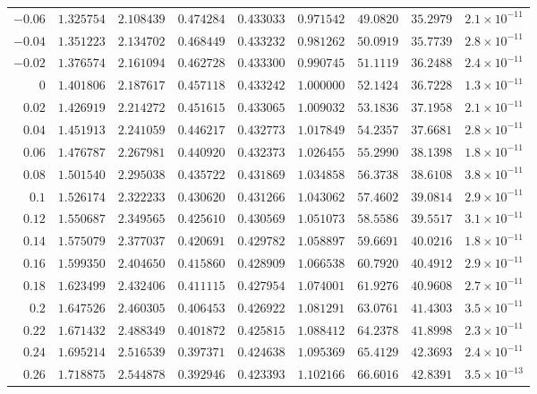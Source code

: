 \documentclass[12pt]{extarticle}
\theoremstyle{plain}
\theoremstyle{remark}
\begin{document}
{\begin{longtable}{rcccccccc}
$-0.06$ & $1.325754$ & $2.108439$ & $0.474284$ & $0.433033$ & $0.971542$ & $49.0820$ & $35.2979$ & $2.1\times10^{-11}$ \\
$-0.04$ & $1.351223$ & $2.134702$ & $0.468449$ & $0.433232$ & $0.981262$ & $50.0919$ & $35.7739$ & $2.8\times10^{-11}$ \\
$-0.02$ & $1.376574$ & $2.161094$ & $0.462728$ & $0.433300$ & $0.990745$ & $51.1119$ & $36.2488$ & $2.4\times10^{-11}$ \\
$0$ & $1.401806$ & $2.187617$ & $0.457118$ & $0.433242$ & $1.000000$ & $52.1424$ & $36.7228$ & $1.3\times10^{-11}$ \\
$0.02$ & $1.426919$ & $2.214272$ & $0.451615$ & $0.433065$ & $1.009032$ & $53.1836$ & $37.1958$ & $2.1\times10^{-11}$ \\
$0.04$ & $1.451913$ & $2.241059$ & $0.446217$ & $0.432773$ & $1.017849$ & $54.2357$ & $37.6681$ & $2.8\times10^{-11}$ \\
$0.06$ & $1.476787$ & $2.267981$ & $0.440920$ & $0.432373$ & $1.026455$ & $55.2990$ & $38.1398$ & $1.8\times10^{-11}$ \\
$0.08$ & $1.501540$ & $2.295038$ & $0.435722$ & $0.431869$ & $1.034858$ & $56.3738$ & $38.6108$ & $3.8\times10^{-11}$ \\
$0.1$ & $1.526174$ & $2.322233$ & $0.430620$ & $0.431266$ & $1.043062$ & $57.4602$ & $39.0814$ & $2.9\times10^{-11}$ \\
$0.12$ & $1.550687$ & $2.349565$ & $0.425610$ & $0.430569$ & $1.051073$ & $58.5586$ & $39.5517$ & $3.1\times10^{-11}$ \\
$0.14$ & $1.575079$ & $2.377037$ & $0.420691$ & $0.429782$ & $1.058897$ & $59.6691$ & $40.0216$ & $1.8\times10^{-11}$ \\
$0.16$ & $1.599350$ & $2.404650$ & $0.415860$ & $0.428909$ & $1.066538$ & $60.7920$ & $40.4912$ & $2.9\times10^{-11}$ \\
$0.18$ & $1.623499$ & $2.432406$ & $0.411115$ & $0.427954$ & $1.074001$ & $61.9276$ & $40.9608$ & $2.7\times10^{-11}$ \\
$0.2$ & $1.647526$ & $2.460305$ & $0.406453$ & $0.426922$ & $1.081291$ & $63.0761$ & $41.4303$ & $3.5\times10^{-11}$ \\
$0.22$ & $1.671432$ & $2.488349$ & $0.401872$ & $0.425815$ & $1.088412$ & $64.2378$ & $41.8998$ & $2.3\times10^{-11}$ \\
$0.24$ & $1.695214$ & $2.516539$ & $0.397371$ & $0.424638$ & $1.095369$ & $65.4129$ & $42.3693$ & $2.4\times10^{-11}$ \\
$0.26$ & $1.718875$ & $2.544878$ & $0.392946$ & $0.423393$ & $1.102166$ & $66.6016$ & $42.8391$ & $3.5\times10^{-13}$ \\

\end{longtable}}
\end{document}

